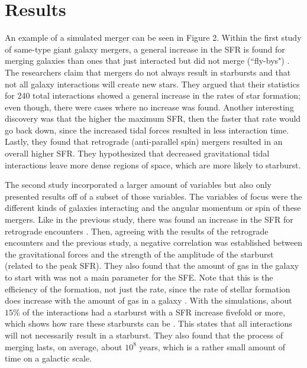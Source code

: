 \documentclass[11pt]{article} %
\begin{document}
\section{Results}
	An example of a simulated merger can be seen in Figure 2. Within the first study of same-type giant galaxy mergers, a general increase in the SFR is found for merging galaxies than ones that just interacted but did not merge (``fly-bys") \cite{mergerstats}. The researchers claim that mergers do not always result in starbursts and that not all galaxy interactions will create new stars. They argued that their statistics for 240 total interactions showed a general increase in the rates of star formation; even though, there were cases where no increase was found. Another interesting discovery was that the higher the maximum SFR, then the faster that rate would go back down, since the increased tidal forces resulted in less interaction time. Lastly, they found that retrograde (anti-parallel spin) mergers resulted in an overall higher SFR. They hypothesized that decreased gravitational tidal interactions leave more dense regions of space, which are more likely to starburst.

	The second study incorporated a larger amount of variables but also only presented results off of a subset of those variables. The variables of focus were the different kinds of galaxies interacting and the angular momentum or spin of these mergers. Like in the previous study, there was found an increase in the SFR for retrograde encounters \cite{mergers}. Then, agreeing with the results of the retrograde encounters and the previous study, a negative correlation was established between the gravitational forces and the strength of the amplitude of the starburst (related to the peak SFR). They also found that the amount of gas in the galaxy to start with was not a main parameter for the SFE. Note that this is the efficiency of the formation, not just the rate, since the rate of stellar formation does increase with the amount of gas in a galaxy \cite{LBG}. With the simulations, about $15\%$ of the interactions had a starburst with a SFR increase fivefold or more, which shows how rare these starbursts can be \cite{mergers}. This states that all interactions will not necessarily result in a starburst. They also found that the process of merging lasts, on average, about $10^8$ years, which is a rather small amount of time on a galactic scale.
\end{document}

